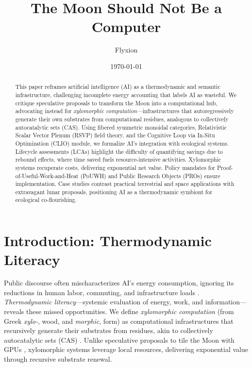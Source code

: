 \documentclass[12pt]{article}
\title{The Moon Should Not Be a Computer}
\author{Flyxion}
\date{\today}
\theoremstyle{plain}
\begin{document}
\maketitle

\begin{abstract}
This paper reframes artificial intelligence (AI) as a thermodynamic and semantic infrastructure, challenging incomplete energy accounting that labels AI as wasteful. We critique speculative proposals to transform the Moon into a computational hub, advocating instead for \emph{xylomorphic computation}—infrastructures that autoregressively generate their own substrates from computational residues, analogous to collectively autocatalytic sets (CAS). Using fibered symmetric monoidal categories, Relativistic Scalar Vector Plenum (RSVP) field theory, and the Cognitive Loop via In-Situ Optimization (CLIO) module, we formalize AI’s integration with ecological systems. Lifecycle assessments (LCAs) highlight the difficulty of quantifying savings due to rebound effects, where time saved fuels resource-intensive activities. Xylomorphic systems recuperate costs, delivering exponential net value. Policy mandates for Proof-of-Useful-Work-and-Heat (PoUWH) and Public Research Objects (PROs) ensure implementation. Case studies contrast practical terrestrial and space applications with extravagant lunar proposals, positioning AI as a thermodynamic symbiont for ecological co-flourishing.
\end{abstract}

\section{Introduction: Thermodynamic Literacy}
\label{sec:introduction}

Public discourse often mischaracterizes AI’s energy consumption, ignoring its reductions in human labor, commuting, and infrastructure loads \citep{Strubell2019, Koomey2011}. \emph{Thermodynamic literacy}—systemic evaluation of energy, work, and information—reveals these missed opportunities. We define \emph{xylomorphic computation} (from Greek \emph{xylo-}, wood, and \emph{morphic}, form) as computational infrastructures that recursively generate their substrates from residues, akin to collectively autocatalytic sets (CAS) \citep{Kauffman1993}. Unlike speculative proposals to tile the Moon with GPUs \citep{Shams2025}, xylomorphic systems leverage local resources, delivering exponential value through recursive substrate renewal.
\end{document}
